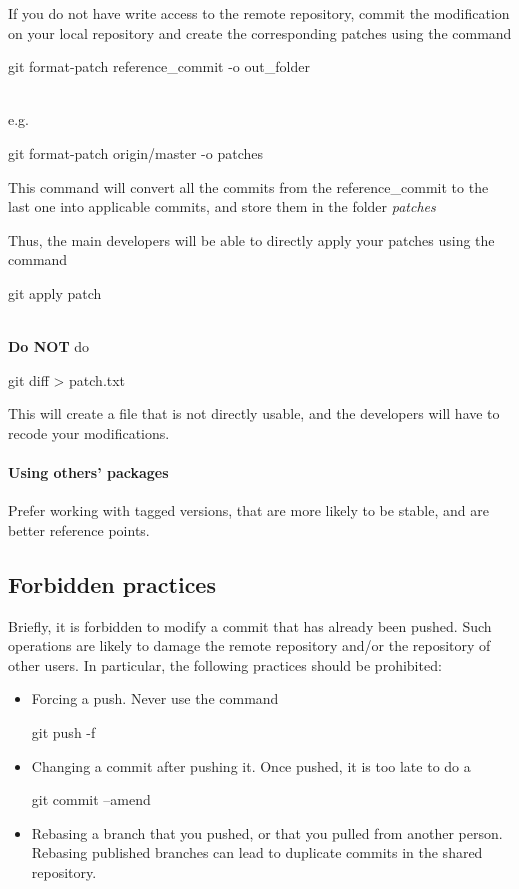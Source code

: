 If you do not have write access to the remote repository, commit the modification on your local repository and create the corresponding patches using the command 
\begin{tt}git format-patch reference\_commit -o out\_folder\end{tt}\\
e.g. 
\begin{tt}git format-patch origin/master -o patches\end{tt}

This command will convert all the commits from the reference\_commit to the last one into applicable commits,
and store them in the folder \textit{patches}

Thus, the main developers will be able to directly apply your patches using the command
\begin{tt}git apply patch\end{tt}\\

\textbf{Do NOT} do \begin{tt}git diff > patch.txt\end{tt}
This will create a file that is not directly usable, and the developers will have to recode your modifications.

\paragraph{Using others' packages}
Prefer working with tagged versions, that are more likely to be stable, and are better reference points.


\subsection{Forbidden practices}
Briefly, it is forbidden to modify a commit that has already been pushed. 
Such operations are likely to damage the remote repository and/or the repository of other users.
In particular, the following practices should be prohibited: 
\begin{itemize}
\item Forcing a push. Never use the command \begin{tt}{git push -f}\end{tt}
\item Changing a commit after pushing it. Once pushed, it is too late to do a \begin{tt}{git commit –amend}\end{tt}
\item Rebasing a branch that you pushed, or that you pulled from another person. 
Rebasing published branches can lead to duplicate commits in the shared repository.
\end{itemize}

